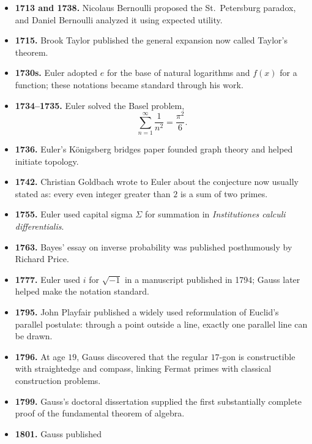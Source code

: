 \begin{itemize}
              of circumference to diameter; Euler later popularized it.
        \item \textbf{1713 and 1738.} Nicolaus Bernoulli proposed the
              St.\ Petersburg paradox, and Daniel Bernoulli analyzed it using
              expected utility.
        \item \textbf{1715.} Brook Taylor published the general expansion now
              called Taylor's theorem.
        \item \textbf{1730s.} Euler adopted $e$ for the base of natural
              logarithms and $f(x)$ for a function; these notations became
              standard through his work.
        \item \textbf{1734--1735.} Euler solved the Basel problem,
              \[
                  \sum_{n=1}^{\infty}\frac{1}{n^2}=\frac{\pi^2}{6}.
              \]
        \item \textbf{1736.} Euler's Königsberg bridges paper founded graph
              theory and helped initiate topology.
        \item \textbf{1742.} Christian Goldbach wrote to Euler about the
              conjecture now usually stated as: every even integer greater than
              $2$ is a sum of two primes.
        \item \textbf{1755.} Euler used capital sigma $\Sigma$ for summation in
              \textit{Institutiones calculi differentialis}.
        \item \textbf{1763.} Bayes' essay on inverse probability was published
              posthumously by Richard Price.
        \item \textbf{1777.} Euler used $i$ for $\sqrt{-1}$ in a manuscript
              published in 1794; Gauss later helped make the notation standard.
        \item \textbf{1795.} John Playfair published a widely used reformulation
              of Euclid's parallel postulate: through a point outside a line,
              exactly one parallel line can be drawn.
        \item \textbf{1796.} At age $19$, Gauss discovered that the regular
              $17$-gon is constructible with straightedge and compass, linking
              Fermat primes with classical construction problems.
        \item \textbf{1799.} Gauss's doctoral dissertation supplied the first
              substantially complete proof of the fundamental theorem of
              algebra.
        \item \textbf{1801.} Gauss published

\end{itemize}
